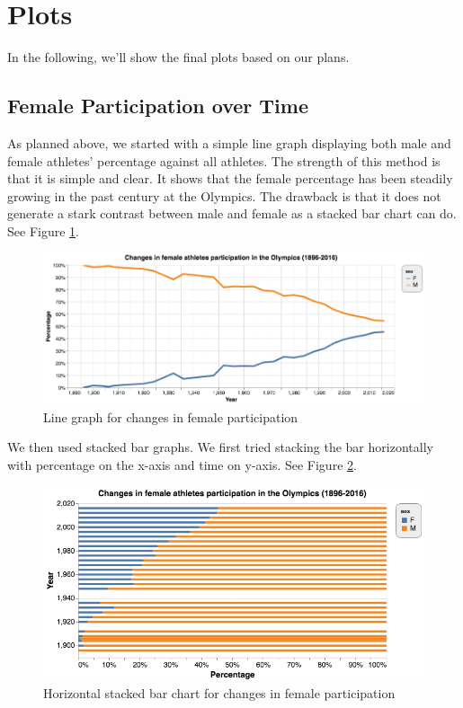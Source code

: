 \documentclass[
]{article}
\begin{document}
\hypertarget{plots}{%
\section{Plots}\label{plots}}

In the following, we'll show the final plots based on our plans.

\hypertarget{plots-female-time}{%
\subsection{Female Participation over Time}\label{plots-female-time}}

As planned above, we started with a simple line graph displaying both male and female athletes' percentage against all athletes. The strength of this method is that it is simple and clear. It shows that the female percentage has been steadily growing in the past century at the Olympics. The drawback is that it does not generate a stark contrast between male and female as a stacked bar chart can do. See Figure \ref{fig:figure21}.

\begin{figure}

{\centering \includegraphics[width=1\linewidth]{static/pics/g-1-1} 

}

\caption{Line graph for changes in female participation}\label{fig:figure21}
\end{figure}

We then used stacked bar graphs. We first tried stacking the bar horizontally with percentage on the x-axis and time on y-axis. See Figure \ref{fig:figure22}.

\begin{figure}

{\centering \includegraphics[width=1\linewidth]{static/pics/g-1-2} 

}

\caption{Horizontal stacked bar chart for changes in female participation}\label{fig:figure22}
\end{figure}
\end{document}
